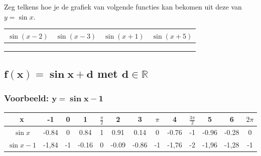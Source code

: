 \documentclass[a4paper,12pt]{article}
\begin{document}
\begin{oefening}
Zeg telkens hoe je de grafiek van volgende functies kan bekomen uit deze van $y=\sin x$.
\begin{center}
  \begin{tabular}{c|c|c|c}
    $\sin (x-2)$ & $\sin (x-3)$ & $\sin (x+1)$ & $\sin (x+5)$\\
    \hline
    \hspace*{3cm} &\hspace*{3cm}&\hspace*{3cm}&\hspace*{3cm}
    \\
    &&&
    \\
    &&&
  \end{tabular}
\end{center}
\end{oefening}

\subsection{$\boldsymbol{f(x)=\sin x + d}$ met $\boldsymbol{d\in \mathbb{R}}$} 
\subsubsection{Voorbeeld: $\boldsymbol{y=\sin x-1}$}
\begin{adjustwidth}{-2.5cm}{-2.5cm}
\begin{center}
\scriptsize
  \begin{tabular}{c|c|c|c|c|c|c|c|c|c|c|c|c}
    x & -1 & 0 & 1 &  $\frac{\pi}{2}$ & 2 & 3 & $\pi$ & 4 & $\frac{3\pi}{2}$ & 5 & 6 & $2\pi$
    \\
    \hline
   $\sin x$ &-0.84&0&0.84&1&0.91&0.14&0&-0.76&-1&-0.96&-0.28 &0
    \\
    \hline
   $\sin x-1$ &-1,84& -1& -0.16& 0& -0.09& -0.86& -1& -1,76& -2& -1,96& -1,28 &-1
  \end{tabular}
\end{center}
\end{adjustwidth}
\end{document}
